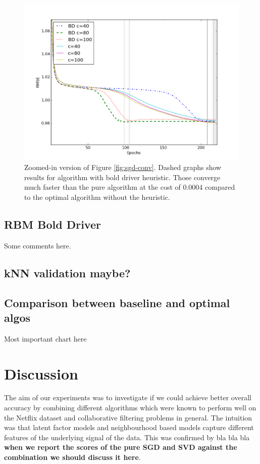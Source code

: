\documentclass[10pt,conference,compsocconf]{IEEEtran}
\begin{document}
\begin{figure}[htbp]
  \centering
  \includegraphics[width=\columnwidth]{convergence_zoom_all.png}
  \caption{Zoomed-in version of Figure \ref{fig:sgd-conv}. Dashed graphs show results for algorithm with bold driver heuristic. Those converge much faster than the pure algorithm at the cost of 0.0004 compared to the optimal algorithm without the heuristic.}
  \label{fig:sgd-conv-zoom}
\end{figure} 
 
\subsection{RBM Bold Driver}
Some comments here.

\subsection{kNN validation maybe?}

\subsection{Comparison between baseline and optimal algos}
Most important chart here


\section{Discussion}
\label{sec:discussion}
The aim of our experiments was to investigate if we could achieve better overall accuracy by combining different algorithms which were known to perform well on the Netflix dataset and collaborative filtering problems in general. The intuition was that latent factor models and neighbourhood based models capture different features of the underlying signal of the data. This was confirmed by bla bla bla \textbf{when we report the scores  of the pure SGD and SVD against the combination we should discuss it here}. 
\end{document}
